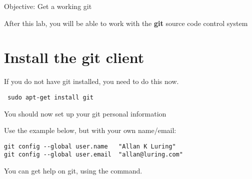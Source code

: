 {Objective: Get a working git}

After this lab, you will be able to work with the {\bf git} source code control system

\section{Install the git client}

If you do not have git installed, you need to do this now.

{\small
{\tt
sudo apt-get install git
}
}

You should now set up your git personal information

Use the example below, but with your own name/email:

\begin{verbatim}
git config --global user.name	"Allan K Luring"
git config --global user.email	"allan@luring.com"
\end{verbatim}

You can get help on git, using the  command.
